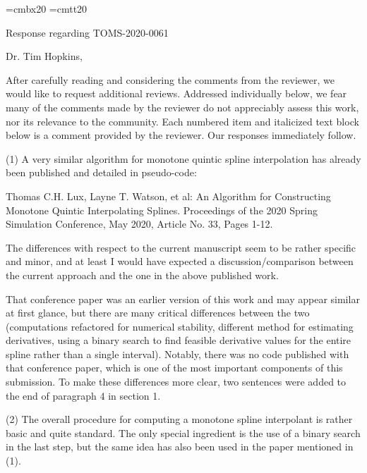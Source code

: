 
\parindent=0pt
\parskip=12pt

\font\titlebf=cmbx20
\font\titlett=cmtt20

{\titlebf Response regarding {\titlett TOMS-2020-0061} \bigskip}

Dr. Tim Hopkins,

After carefully reading and considering the comments from the reviewer, we would like to request additional reviews. Addressed individually below, we fear many of the comments made by the reviewer do not appreciably assess this work, nor its relevance to the community. Each numbered item and italicized text block below is a comment provided by the reviewer. Our responses immediately follow.

{\parindent=20pt \it

\item{(1)} A very similar algorithm for monotone quintic spline interpolation has already been published and detailed in pseudo-code:

\itemitem{} Thomas C.H. Lux, Layne T. Watson, et al: An Algorithm for Constructing Monotone Quintic Interpolating Splines. Proceedings of the 2020 Spring Simulation Conference, May 2020, Article No. 33, Pages 1-12.

\item{} The differences with respect to the current manuscript seem to be rather specific and minor, and at least I would have expected a discussion/comparison between the current approach and the one in the above published work.

}

That conference paper was an earlier version of this work and may appear similar at first glance, but there are many critical differences between the two (computations refactored for numerical stability, different method for estimating derivatives, using a binary search to find feasible derivative values for the entire spline rather than a single interval). Notably, there was no code published with that conference paper, which is one of the most important components of this submission. To make these differences more clear, two sentences were added to the end of paragraph 4 in section 1.

{\parindent=20pt \it

\item{(2)} The overall procedure for computing a monotone spline interpolant is rather basic and quite standard. The only special ingredient is the use of a binary search in the last step, but the same idea has also been used in the paper mentioned in (1).

}

